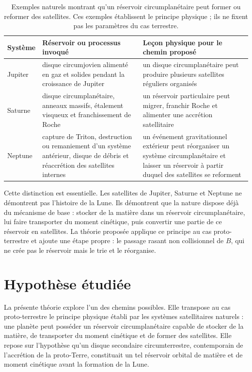 \documentclass[11pt,a4paper,openany]{report}
\begin{document}
\begin{table}[htbp]
\centering
\small
\caption{Exemples naturels montrant qu'un réservoir circumplanétaire peut former ou reformer des
satellites. Ces exemples établissent le principe physique ; ils ne fixent pas les paramètres du
cas terrestre.}
\label{tab:ancrage-satellites}
\begin{tabularx}{\textwidth}{>{\raggedright\arraybackslash}p{2.4cm}
>{\raggedright\arraybackslash}X >{\raggedright\arraybackslash}X}
\toprule
\textbf{Système} & \textbf{Réservoir ou processus invoqué} & \textbf{Leçon physique pour le chemin proposé} \\
\midrule
Jupiter & disque circumjovien alimenté en gaz et solides pendant la croissance de Jupiter &
un disque circumplanétaire peut produire plusieurs satellites réguliers organisés \\
Saturne & disque circumplanétaire, anneaux massifs, étalement visqueux et franchissement de Roche &
un réservoir particulaire peut migrer, franchir Roche et alimenter une accrétion satellitaire \\
Neptune & capture de Triton, destruction ou remaniement d'un système antérieur, disque de débris et
réaccrétion des satellites internes &
un événement gravitationnel extérieur peut réorganiser un système circumplanétaire et laisser un
réservoir à partir duquel des satellites se reforment \\
\bottomrule
\end{tabularx}
\end{table}

Cette distinction est essentielle. Les satellites de Jupiter, Saturne et Neptune ne démontrent pas
l'histoire de la Lune. Ils démontrent que la nature dispose déjà du mécanisme de base : stocker de
la matière dans un réservoir circumplanétaire, lui faire transporter du moment cinétique, puis
convertir une partie de ce réservoir en satellites. La théorie proposée applique ce principe au
cas proto-terrestre et ajoute une étape propre : le passage rasant non collisionnel de $B$, qui ne
crée pas le réservoir mais le trie et le réorganise.

\section{Hypothèse étudiée}

La présente théorie explore l'un des chemins possibles. Elle transpose au cas proto-terrestre le
principe physique établi par les systèmes satellitaires naturels : une planète peut posséder un
réservoir circumplanétaire capable de stocker de la matière, de transporter du moment cinétique
et de former des satellites. Elle repose sur l'hypothèse qu'un disque secondaire
circumterrestre, contemporain de l'accrétion de la proto-Terre, constituait un tel réservoir
orbital de matière et de moment cinétique avant la formation de la Lune.
\end{document}

